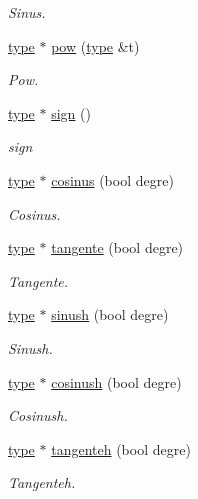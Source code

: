\begin{DoxyCompactItemize}
\begin{DoxyCompactList}\small\item\em Sinus. \end{DoxyCompactList}\item 
\hyperlink{classtype}{type} $\ast$ \hyperlink{classrationnel_afd9fd9a30f034952ce889d46a07de617}{pow} (\hyperlink{classtype}{type} \&t)
\begin{DoxyCompactList}\small\item\em Pow. \end{DoxyCompactList}\item 
\hyperlink{classtype}{type} $\ast$ \hyperlink{classrationnel_aa73709167be428fafc4d95a31f4c3cc0}{sign} ()
\begin{DoxyCompactList}\small\item\em sign \end{DoxyCompactList}\item 
\hyperlink{classtype}{type} $\ast$ \hyperlink{classrationnel_a4a2f7528592b31a367799a79c336395c}{cosinus} (bool degre)
\begin{DoxyCompactList}\small\item\em Cosinus. \end{DoxyCompactList}\item 
\hyperlink{classtype}{type} $\ast$ \hyperlink{classrationnel_ac2bdc47a11ea3d010f006256f6e14f79}{tangente} (bool degre)
\begin{DoxyCompactList}\small\item\em Tangente. \end{DoxyCompactList}\item 
\hyperlink{classtype}{type} $\ast$ \hyperlink{classrationnel_a107f6a0be55879bd49dd015144fdfde4}{sinush} (bool degre)
\begin{DoxyCompactList}\small\item\em Sinush. \end{DoxyCompactList}\item 
\hyperlink{classtype}{type} $\ast$ \hyperlink{classrationnel_af8de9bc6850dc5471d2e31ddf8e3866e}{cosinush} (bool degre)
\begin{DoxyCompactList}\small\item\em Cosinush. \end{DoxyCompactList}\item 
\hyperlink{classtype}{type} $\ast$ \hyperlink{classrationnel_a56135a99618c1fec82901c5e7f64a4a2}{tangenteh} (bool degre)
\begin{DoxyCompactList}\small\item\em Tangenteh. \end{DoxyCompactList}\item 

\end{DoxyCompactItemize}

